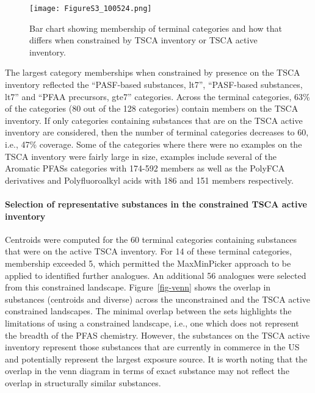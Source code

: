 \documentclass[
  super,
  preprint,
  3p]{elsarticle}
\let\oldparagraph\paragraph
\renewcommand{\paragraph}[1]{\oldparagraph{#1}\mbox{}}
\begin{document}
\begin{figure}

{\centering \texttt{[image: FigureS3\_100524.png]}

}

\caption{\label{fig-barplot-tsca}Bar chart showing membership of
terminal categories and how that differs when constrained by TSCA
inventory or TSCA active inventory.}

\end{figure}

The largest category memberships when constrained by presence on the
TSCA inventory reflected the ``PASF-based substances, lt7'',
``PASF-based substances, lt7'' and ``PFAA precursors, gte7'' categories.
Across the terminal categories, 63\% of the categories (80 out of the
128 categories) contain members on the TSCA inventory. If only
categories containing substances that are on the TSCA active inventory
are considered, then the number of terminal categories decreases to 60,
i.e., 47\% coverage. Some of the categories where there were no examples
on the TSCA inventory were fairly large in size, examples include
several of the Aromatic PFASs categories with 174-592 members as well as
the PolyFCA derivatives and Polyfluoroalkyl acids with 186 and 151
members respectively.

\hypertarget{sec-maxmin-tsca}{%
\paragraph{Selection of representative substances in the constrained
TSCA active inventory}\label{sec-maxmin-tsca}}

Centroids were computed for the 60 terminal categories containing
substances that were on the active TSCA inventory. For 14 of these
terminal categories, membership exceeded 5, which permitted the
MaxMinPicker approach to be applied to identified further analogues. An
additional 56 analogues were selected from this constrained landscape.
Figure~\ref{fig-venn} shows the overlap in substances (centroids and
diverse) across the unconstrained and the TSCA active constrained
landscapes. The minimal overlap between the sets highlights the
limitations of using a constrained landscape, i.e., one which does not
represent the breadth of the PFAS chemistry. However, the substances on
the TSCA active inventory represent those substances that are currently
in commerce in the US and potentially represent the largest exposure
source. It is worth noting that the overlap in the venn diagram in terms
of exact substance may not reflect the overlap in structurally similar
substances.
\end{document}
